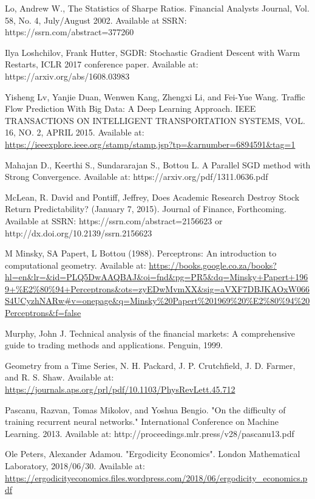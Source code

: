 \documentclass[a4paper,11pt,oneside]{article}
\theoremstyle{plain}
\theoremstyle{definition}
\begin{document}
\begin{thebibliography}{bibliography}
Lo, Andrew W., The Statistics of Sharpe Ratios. Financial Analysts Journal, Vol. 58, No. 4, July/August 2002. Available at SSRN: https://ssrn.com/abstract=377260

Ilya Loshchilov, Frank Hutter, SGDR: Stochastic Gradient Descent with Warm Restarts, ICLR 2017 conference paper. Available at: https://arxiv.org/abs/1608.03983


Yisheng Lv, Yanjie Duan, Wenwen Kang, Zhengxi Li, and Fei-Yue Wang. Traffic Flow Prediction With Big Data:
A Deep Learning Approach. IEEE TRANSACTIONS ON INTELLIGENT TRANSPORTATION SYSTEMS, VOL. 16, NO. 2, APRIL 
2015. Available at: \url{https://ieeexplore.ieee.org/stamp/stamp.jsp?tp=&arnumber=6894591&tag=1}

Mahajan D., Keerthi S., Sundararajan S., Bottou L. A Parallel SGD method with Strong 
Convergence. Available at: https://arxiv.org/pdf/1311.0636.pdf

McLean, R. David and Pontiff, Jeffrey, Does Academic Research Destroy Stock Return Predictability? (January 7, 2015). Journal of Finance, Forthcoming. Available at SSRN: https://ssrn.com/abstract=2156623 or http://dx.doi.org/10.2139/ssrn.2156623

M Minsky, SA Papert, L Bottou (1988). Perceptrons: An introduction to computational  geometry. Available at: \url{https://books.google.co.za/books?hl=en&lr=&id=PLQ5DwAAQBAJ&oi=fnd&pg=PR5&dq=Minsky+Papert+1969+%E2%80%94+Perceptrons&ots=zyEDwMvmXX&sig=aVXF7DBJKAOxW066S4UCyzhNARw#v=onepage&q=Minsky%20Papert%201969%20%E2%80%94%20Perceptrons&f=false}

Murphy, John J. Technical analysis of the financial markets: A comprehensive guide to trading methods and applications. Penguin, 1999.

Geometry from a Time Series, N. H. Packard, J. P. Crutchfield, J. D. Farmer, and R. S. Shaw. Available at: \url{https://journals.aps.org/prl/pdf/10.1103/PhysRevLett.45.712}

Pascanu, Razvan, Tomas Mikolov, and Yoshua Bengio. "On the difficulty of training recurrent neural networks." International Conference on Machine Learning. 2013.
Available at: http://proceedings.mlr.press/v28/pascanu13.pdf

Ole Peters, Alexander Adamou. "Ergodicity Economics". London Mathematical Laboratory, 2018/06/30. Available at: \url{https://ergodicityeconomics.files.wordpress.com/2018/06/ergodicity_economics.pdf}


\end{thebibliography}
\end{document}
